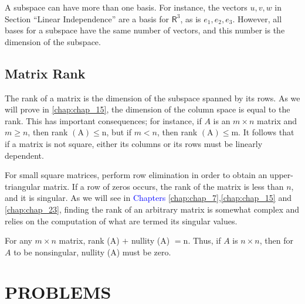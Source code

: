 \documentclass[../main.tex]{subfiles}
\begin{document}
A subspace can have more than one basis. For instance, the vectors $u, v, w$ in Section “Linear Independence” are a basis for $\mathsf{R}^{3}$, as is $e_1, e_2, e_3$. However, all bases for a subspace have the same number of vectors, and this number is the dimension of the subspace.

\subsection*{Matrix Rank}
The rank of a matrix is the dimension of the subspace spanned by its rows. As we will prove in \autoref{chap:chap_15}, the dimension of the column space is equal to the rank. This has important consequences; for instance, if $A$ is an $m \times n$ matrix and $m \geq n$, then rank $(\mathrm{A}) \leq \mathrm{n}$, but if $m<n$, then rank $(\mathrm{A}) \leq \mathrm{m} .$ It follows that if a matrix is not square, either its columns or its rows must be linearly dependent.

For small square matrices, perform row elimination in order to obtain an upper-triangular matrix. If a row of zeros occurs, the rank of the matrix is less than $n$, and it is singular. As we will see in \textcolor{blue}{Chapters \ref{chap:chap_7}},\ref{chap:chap_15} and \ref{chap:chap_23}, finding the rank of an arbitrary matrix is somewhat complex and relies on the computation of what are termed its singular values.

For any $m \times n$ matrix, rank (A) $+$ nullity (A) $=\mathrm{n}$. Thus, if $A$ is $n \times n$, then for $A$ to be nonsingular, nullity (A) must be zero.

\section[Problems]{PROBLEMS}
\end{document}

